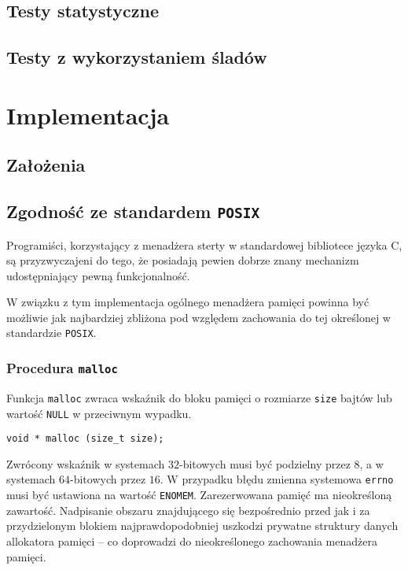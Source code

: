 \documentclass[12pt,a4paper,titlepage,twoside]{mwart}
\begin{document}
\subsection{Testy statystyczne}

\subsection{Testy z wykorzystaniem śladów}

\newpage


\section{Implementacja}

\subsection{Założenia}

\newpage

\subsection{Zgodność ze standardem \texttt{POSIX}}

Programiści, korzystający z menadżera sterty w standardowej bibliotece języka
C, są przyzwyczajeni do tego, że posiadają pewien dobrze znany mechanizm
udostępniający pewną funkcjonalność.

W związku z tym implementacja ogólnego menadżera pamięci powinna być możliwie
jak najbardziej zbliżona pod względem zachowania do tej określonej w
standardzie \texttt{POSIX}.

\subsubsection{Procedura \texttt{malloc}}

Funkcja \texttt{malloc} zwraca wskaźnik do bloku pamięci o rozmiarze
\texttt{size} bajtów lub wartość \texttt{NULL} w przeciwnym wypadku.

\vspace{2ex}
\begin{lstlisting}[caption={Prototyp procedury \texttt{malloc}.}]
void * malloc (size_t size);
\end{lstlisting}

Zwrócony wskaźnik w systemach $32$-bitowych musi być podzielny przez $8$, a w
systemach $64$-bitowych przez $16$. W przypadku błędu zmienna systemowa
\texttt{errno} musi być ustawiona na wartość \texttt{ENOMEM}. Zarezerwowana
pamięć ma nieokreśloną zawartość. Nadpisanie obszaru znajdującego się
bezpośrednio przed jak i za przydzielonym blokiem najprawdopodobniej uszkodzi
prywatne struktury danych allokatora pamięci -- co doprowadzi do nieokreślonego
zachowania menadżera pamięci.
\end{document}
